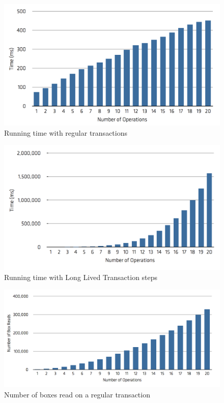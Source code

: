 \begin{figure}
\centering
\includegraphics[width=0.9\linewidth]{time-regular}
\caption{Running time with regular transactions}
\label{fig:regTime}
\end{figure}

\begin{figure}
\centering
\includegraphics[width=0.9\linewidth]{time-long-v1}
\caption{Running time with Long Lived Transaction steps}
\end{figure}

\begin{figure}
\centering
\includegraphics[width=0.9\linewidth]{box-regular}
\caption{Number of boxes read on a regular transaction}
\label{fig:reg-box}
\end{figure}

